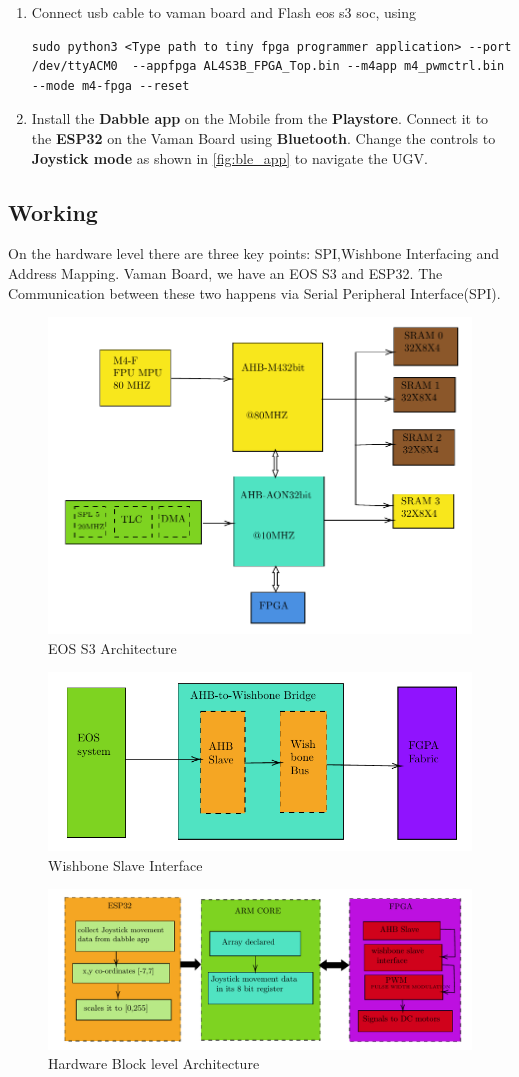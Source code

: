 \begin{enumerate}[resume]
\item Connect usb cable to vaman board and Flash eos s3 soc, using
\begin{lstlisting}
sudo python3 <Type path to tiny fpga programmer application> --port /dev/ttyACM0  --appfpga AL4S3B_FPGA_Top.bin --m4app m4_pwmctrl.bin --mode m4-fpga --reset
\end{lstlisting} 

\item Install the \textbf{Dabble app} on the Mobile from the \textbf{Playstore}.
Connect it to the \textbf{ESP32} on the Vaman Board using \textbf{Bluetooth}.
Change the controls to \textbf{Joystick mode} as shown in
\autoref{fig:ble_app} to navigate the UGV.
\end{enumerate}
\subsection{Working }
On the hardware level there are three key points: SPI,Wishbone Interfacing and Address Mapping. Vaman Board, we have an EOS S3 and ESP32. The Communication between these two happens via Serial Peripheral Interface(SPI).\\
\vspace{0.25cm}

\begin{figure}[!ht]
\centering
\includegraphics[width=0.5\columnwidth]{ugv/figs/block3}
\centering
\caption{EOS S3 Architecture }
\end{figure}

\begin{figure}[!ht]
\centering
\includegraphics[width=0.5\columnwidth]{ugv/figs/block4}
\centering
\caption{Wishbone Slave Interface  }
\end{figure}
\begin{figure}[!ht]
\centering
\includegraphics[width=0.5\columnwidth]{ugv/figs/block5}
\centering
\caption{Hardware Block level Architecture }
\end{figure}
